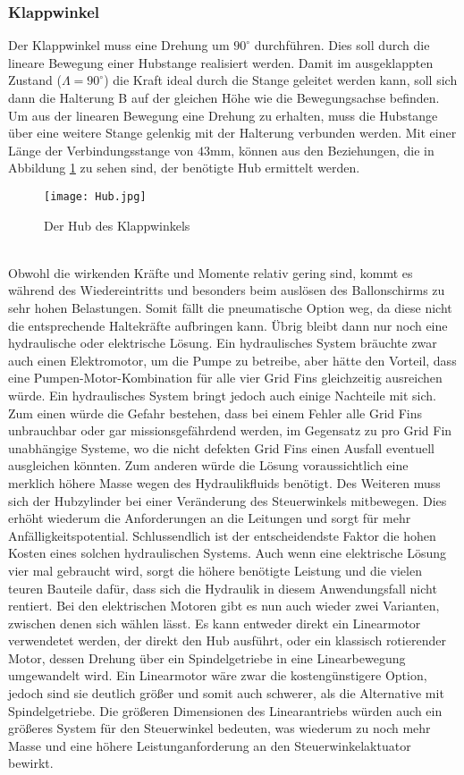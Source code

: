 \subsubsection{Klappwinkel}
Der Klappwinkel muss eine Drehung um $90^\circ$ durchführen. Dies soll durch die lineare Bewegung einer Hubstange realisiert werden. Damit im ausgeklappten Zustand ($\Lambda = 90^\circ$) die Kraft ideal durch die Stange geleitet werden kann, soll sich dann die Halterung B auf der gleichen Höhe wie die Bewegungsachse befinden. Um aus der linearen Bewegung eine Drehung zu erhalten, muss die Hubstange über eine weitere Stange gelenkig mit der Halterung verbunden werden. Mit einer Länge der Verbindungsstange von $43$mm, können aus den Beziehungen, die in Abbildung \ref{abb_hub} zu sehen sind, der benötigte Hub ermittelt werden.
\begin{figure}[h]
	\centering
	\texttt{[image: Hub.jpg]}
	\caption{Der Hub des Klappwinkels}
	\label{abb_hub}
\end{figure}\\
Obwohl die wirkenden Kräfte und Momente relativ gering sind, kommt es während des Wiedereintritts und besonders beim auslösen des Ballonschirms zu sehr hohen Belastungen. Somit fällt die pneumatische Option weg, da diese nicht die entsprechende Haltekräfte aufbringen kann. Übrig bleibt dann nur noch eine hydraulische oder elektrische Lösung. Ein hydraulisches System bräuchte zwar auch einen Elektromotor, um die Pumpe zu betreibe, aber hätte den Vorteil, dass eine Pumpen-Motor-Kombination für alle vier Grid Fins gleichzeitig ausreichen würde. Ein hydraulisches System bringt jedoch auch einige Nachteile mit sich. Zum einen würde die Gefahr bestehen, dass bei einem Fehler alle Grid Fins unbrauchbar oder gar missionsgefährdend werden, im Gegensatz zu pro Grid Fin unabhängige Systeme, wo die nicht defekten Grid Fins einen Ausfall eventuell ausgleichen könnten. Zum anderen würde die Lösung voraussichtlich eine merklich höhere Masse wegen des Hydraulikfluids benötigt. Des Weiteren muss sich der Hubzylinder bei einer Veränderung des Steuerwinkels mitbewegen. Dies erhöht wiederum die Anforderungen an die Leitungen und sorgt für mehr Anfälligkeitspotential. Schlussendlich ist der entscheidendste Faktor die hohen Kosten eines solchen hydraulischen Systems. Auch wenn eine elektrische Lösung vier mal gebraucht wird, sorgt die höhere benötigte Leistung und die vielen teuren Bauteile dafür, dass sich die Hydraulik in diesem Anwendungsfall nicht rentiert. Bei den elektrischen Motoren gibt es nun auch wieder zwei Varianten, zwischen denen sich wählen lässt. Es kann entweder direkt ein Linearmotor verwendetet werden, der direkt den Hub ausführt, oder ein klassisch rotierender Motor, dessen Drehung über ein Spindelgetriebe in eine Linearbewegung umgewandelt wird. Ein Linearmotor wäre zwar die kostengünstigere Option, jedoch sind sie deutlich größer und somit auch schwerer, als die Alternative mit Spindelgetriebe. Die größeren Dimensionen des Linearantriebs würden auch ein größeres System für den Steuerwinkel bedeuten, was wiederum zu noch mehr Masse und eine höhere Leistunganforderung an den Steuerwinkelaktuator bewirkt.
